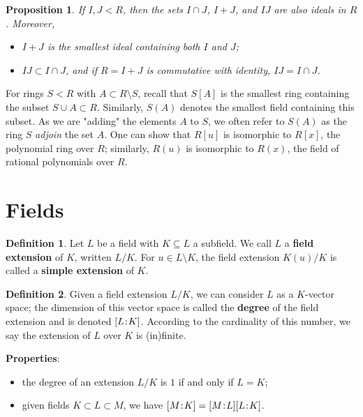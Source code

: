 \documentclass[11pt]{amsart}
\newtheorem*{proposition*}{Proposition}
\theoremstyle{definition}
\newtheorem*{definition*}{Definition}
\renewcommand\:{\colon}
\newcommand{\1}{\mathds{1}}
\renewcommand{\d}[2]{[#1 \hspace{-.2em} : \hspace{-.2em} #2]}
\begin{document}
\begin{proposition*}
	If $I, J < R$, then the sets $I \cap J$, $I + J$, and $I J$ are also ideals in $R$. Moreover,
	\begin{itemize}[leftmargin=22.5pt]\setlength\itemsep{0em}
		\item[\textnormal{(a)}] $I + J$ is the smallest ideal containing both $I$ and $J$;
		\item[\textnormal{(b)}]  $IJ \subset I \cap J$, and if $R = I + J$ is commutative with identity, $IJ = I \cap J$.
	\end{itemize}
\end{proposition*}

For rings $S < R$ with $A \subset R \setminus S$, recall that $S[A]$ is the smallest ring containing the subset $S \cup A \subset R$. Similarly, $S(A)$ denotes the smallest field containing this subset. As we are "adding" the elements $A$ to $S$, we often refer to $S(A)$ as the ring $S$ \textit{adjoin} the set $A$. One can show that $R[u]$ is isomorphic to $R[x]$, the polynomial ring over $R$; similarly, $R(u)$ is isomorphic to $R(x)$, the field of rational polynomials over $R$.

\clearpage











\section{Fields}

\begin{definition*}
	 Let $L$ be a field with $K \subseteq L$ a subfield. We call $L$ a \textbf{field extension} of $K$, written $L/K$. For $u \in L \setminus K$, the field extension $K(u)/K$ is called a \textbf{simple extension} of $K$.
\end{definition*}

\begin{definition*}
	Given a field extension $L/K$, we can consider $L$ as a $K$-vector space; the dimension of this vector space is called the \textbf{degree} of the field extension and is denoted $\d LK$. According to the cardinality of this number, we say the extension of $L$ over $K$ is (in)finite.
\end{definition*}

\noindent \textbf{Properties}:
\begin{itemize}[leftmargin=*]\setlength\itemsep{0em}
	\item the degree of an extension $L/K$ is $1$ if and only if $L = K$;
	\item given fields $K \subset L \subset M$, we have $\d MK = \d ML \d LK$.
\end{itemize}
\end{document}
